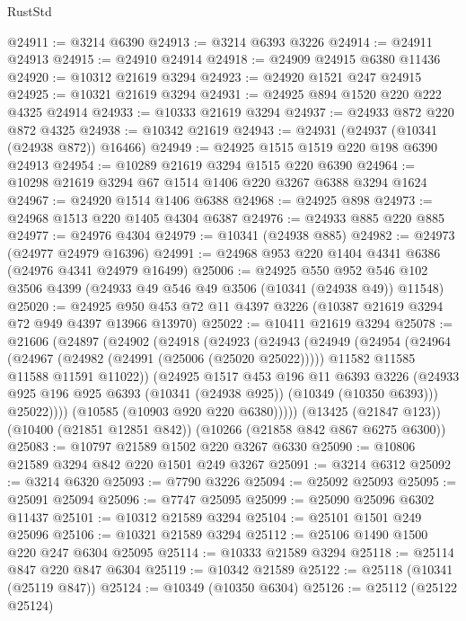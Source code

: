 \begin{lexlean}{RustStd}
\begin{coremodule}
@24911 := @3214 @6390
@24913 := @3214 @6393 @3226
@24914 := @24911 @24913
@24915 := @24910 @24914
@24918 := @24909 @24915 @6380 @11436
@24920 := @10312 @21619 @3294
@24923 := @24920 @1521 @247 @24915
@24925 := @10321 @21619 @3294
@24931 := @24925 @894 @1520 @220 @222 @4325 @24914
@24933 := @10333 @21619 @3294
@24937 := @24933 @872 @220 @872 @4325
@24938 := @10342 @21619
@24943 := @24931 (@24937 (@10341 (@24938 @872)) @16466)
@24949 := @24925 @1515 @1519 @220 @198 @6390 @24913
@24954 := @10289 @21619 @3294 @1515 @220 @6390
@24964 := @10298 @21619 @3294 @67 @1514 @1406 @220 @3267 @6388 @3294 @1624
@24967 := @24920 @1514 @1406 @6388
@24968 := @24925 @898
@24973 := @24968 @1513 @220 @1405 @4304 @6387
@24976 := @24933 @885 @220 @885
@24977 := @24976 @4304
@24979 := @10341 (@24938 @885)
@24982 := @24973 (@24977 @24979 @16396)
@24991 := @24968 @953 @220 @1404 @4341 @6386 (@24976 @4341 @24979 @16499)
@25006 := @24925
    @550
    @952
    @546
    @102
    @3506
    @4399
    (@24933 @49 @546 @49 @3506 (@10341 (@24938 @49)) @11548)
@25020 := @24925 @950 @453 @72 @11 @4397 @3226 (@10387 @21619 @3294 @72 @949 @4397 @13966 @13970)
@25022 := @10411 @21619 @3294
@25078 := @21606
    (@24897
      (@24902
        (@24918
          (@24923
            (@24943
              (@24949
                (@24954
                  (@24964
                    (@24967 (@24982 (@24991 (@25006 (@25020 @25022)))))
                    @11582
                    @11585
                    @11588
                    @11591
                    @11022))
                (@24925
                  @1517
                  @453
                  @196
                  @11
                  @6393
                  @3226
                  (@24933 @925 @196 @925 @6393 (@10341 (@24938 @925)) (@10349 (@10350 @6393)))
                  @25022))))
          (@10585 (@10903 @920 @220 @6380)))))
    (@13425 (@21847 @123))
    (@10400 (@21851 @12851 @842))
    (@10266 (@21858 @842 @867 @6275 @6300))
@25083 := @10797 @21589 @1502 @220 @3267 @6330
@25090 := @10806 @21589 @3294 @842 @220 @1501 @249 @3267
@25091 := @3214 @6312
@25092 := @3214 @6320
@25093 := @7790 @3226
@25094 := @25092 @25093
@25095 := @25091 @25094
@25096 := @7747 @25095
@25099 := @25090 @25096 @6302 @11437
@25101 := @10312 @21589 @3294
@25104 := @25101 @1501 @249 @25096
@25106 := @10321 @21589 @3294
@25112 := @25106 @1490 @1500 @220 @247 @6304 @25095
@25114 := @10333 @21589 @3294
@25118 := @25114 @847 @220 @847 @6304
@25119 := @10342 @21589
@25122 := @25118 (@10341 (@25119 @847))
@25124 := @10349 (@10350 @6304)
@25126 := @25112 (@25122 @25124)

\end{coremodule}
\end{lexlean}
